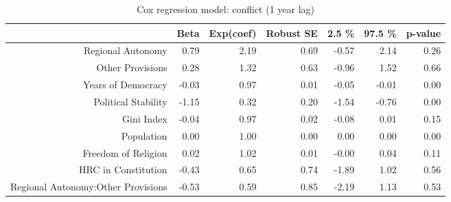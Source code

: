 \begin{table}[ht]
\centering
\begin{tabular}{rrrrrrr}
  \hline
 & Beta & Exp(coef) & Robust SE & 2.5 \% & 97.5 \% & p-value \\ 
  \hline
Regional Autonomy & 0.79 & 2.19 & 0.69 & -0.57 & 2.14 & 0.26 \\ 
  Other Provisions & 0.28 & 1.32 & 0.63 & -0.96 & 1.52 & 0.66 \\ 
  Years of Democracy & -0.03 & 0.97 & 0.01 & -0.05 & -0.01 & 0.00 \\ 
  Political Stability & -1.15 & 0.32 & 0.20 & -1.54 & -0.76 & 0.00 \\ 
  Gini Index & -0.04 & 0.97 & 0.02 & -0.08 & 0.01 & 0.15 \\ 
  Population & 0.00 & 1.00 & 0.00 & 0.00 & 0.00 & 0.00 \\ 
  Freedom of Religion & 0.02 & 1.02 & 0.01 & -0.00 & 0.04 & 0.11 \\ 
  HRC in Constitution & -0.43 & 0.65 & 0.74 & -1.89 & 1.02 & 0.56 \\ 
  Regional Autonomy:Other Provisions & -0.53 & 0.59 & 0.85 & -2.19 & 1.13 & 0.53 \\ 
   \hline
\end{tabular}
\caption{Cox regression model: conflict (1 year lag)} 
\end{table}
